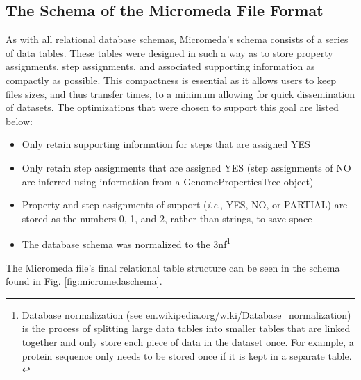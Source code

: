 \subsection{The Schema of the Micromeda File Format}

As with all relational database schemas, Micromeda's schema consists of a series 
of data tables. These tables were designed in such a way as to store property 
assignments, step assignments, and associated supporting information as 
compactly as possible. This compactness is essential as it allows users to keep 
files sizes, and thus transfer times, to a minimum allowing for quick 
dissemination of datasets. The optimizations that were chosen to support this 
goal are listed below:

\begin{itemize}
\item Only retain supporting information for steps that are assigned YES
\item Only retain step assignments that are assigned YES (step assignments of NO 
are inferred using information from a GenomePropertiesTree object)
\item Property and step assignments of support (\textit{i}.\textit{e}., YES, NO, or PARTIAL) are 
stored as the numbers 0, 1, and 2, rather than strings, to save space
\item The database schema was normalized to the \gls{3nf}\footnote{Database 
normalization (see 
\href{http://en.wikipedia.org/wiki/Database_normalization}{en.wikipedia.org/wiki/Database\_normalization}) 
is the process of splitting large data tables into smaller tables that are 
linked together and only store each piece of data in the dataset once. For 
example, a protein sequence only needs to be stored once if it is kept in a 
separate table. \label{normalization-note}} \cite{beeri1989sophisticate} 
\end{itemize}

The Micromeda file's final relational table structure can be seen in the schema 
found in Fig. \ref{fig:micromedaschema}.

